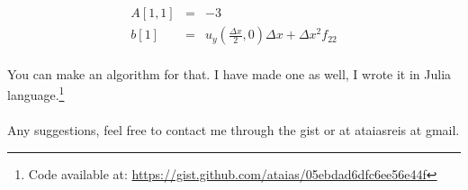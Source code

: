 \documentclass[11pt]{article}
\begin{document}
\begin{eqnarray}
A[1,1] &=& -3\\
b[1] & = & u_y\left(\frac{\Delta x}{2},0\right)\Delta x + \Delta x^2 f_{22}
\end{eqnarray}

\paragraph{} You can make an algorithm for that. I have made one as well, I wrote it in Julia language.\footnote{Code available at: \url{https://gist.github.com/ataias/05ebdad6dfc6ee56e44f}}

\paragraph{} Any suggestions, feel free to contact me through the gist or at ataiasreis at gmail. 
\end{document}
